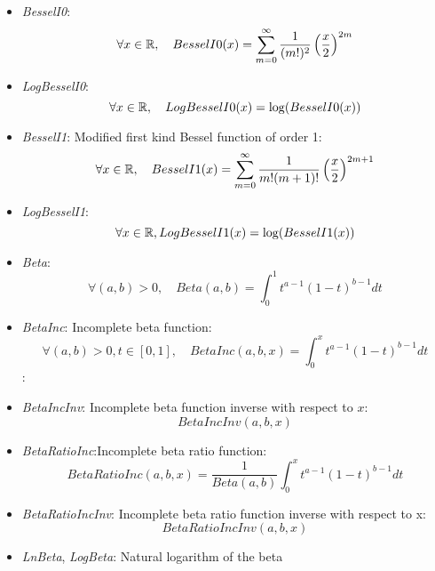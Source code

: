 \begin{itemize}
\item \textit{BesselI0}:
\begin{equation*}
\forall x \in {\mathbb R},\quad
BesselI0(x) = \sum_{m=0}^\infty\frac{1}{(m!)^2}\left(\frac{x}{2}\right)^{2m}
\end{equation*}
\item \textit{LogBesselI0}:
\begin{equation*}
\forall x \in {\mathbb R},\quad
LogBesselI0(x) = \log (BesselI0(x))
\end{equation*}
\item \textit{BesselI1}: Modified first kind Bessel function of order 1:
\begin{equation*}
\forall x \in {\mathbb R},\quad
BesselI1(x) = \sum_{m=0}^\infty\frac{1}{m!(m+1)!}\left(\frac{x}{2}\right)^{2m+1}
\end{equation*}
\item \textit{LogBesselI1}:
\begin{equation*}
\forall x \in {\mathbb R},
LogBesselI1(x) = \log (BesselI1(x))
\end{equation*}
\item \textit{Beta}:
\begin{equation*}
\forall (a,b) >0,\quad
Beta(a, b) = \int_0^1 t^{a-1}(1-t)^{b-1} dt
\end{equation*}
\item \textit{BetaInc}: Incomplete beta function:
\begin{equation*}
\forall (a,b)>0,t\in[0,1],\quad
BetaInc(a, b, x) =
\int_0^x t^{a-1}(1-t)^{b-1} dt
\end{equation*}:
\item \textit{BetaIncInv}: Incomplete beta function inverse with respect to $x$:
\begin{equation*}
BetaIncInv(a, b, x)
\end{equation*}
\item \textit{BetaRatioInc}:Incomplete beta ratio function:
\begin{equation*}
BetaRatioInc(a, b, x) = \frac{1}{Beta(a, b)}\int_0^x t^{a-1}(1-t)^{b-1} dt
\end{equation*}
\item \textit{BetaRatioIncInv}: Incomplete beta ratio function inverse with respect to x:
\begin{equation*}
BetaRatioIncInv(a, b, x)
\end{equation*}
\item \textit{LnBeta}, \textit{LogBeta}: Natural logarithm of the beta

\end{itemize}
